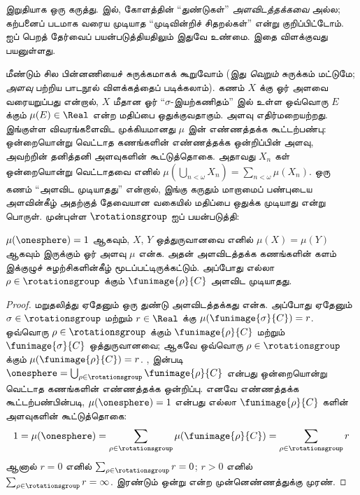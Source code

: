 \documentclass[../../../include/open-logic-section]{subfiles}
\begin{document}
இறுதியாக ஒரு கருத்து.  இல்,
கோளத்தின் ``துண்டுகள்'' \emph{அளவிடத்தக்கவை}
அல்ல; கற்பனைப் படமாக வரைய முடியாத ``முடிவின்றிச்
சிதறல்கள்'' என்று குறிப்பிட்டோம்.
 ஐப் பெறத் தேர்வைப்
பயன்படுத்தியதிலும் இதுவே உண்மை. இதை விளக்குவது
பயனுள்ளது.

மீண்டும் சில பின்னணியைச் சுருக்கமாகக் கூறுவோம்
(இது \emph{வெறும்} சுருக்கம் மட்டுமே; \emph{அளவு}
பற்றிய பாடநூல் விளக்கத்தைப் படிக்கலாம்).
கணம் $X$ க்கு ஓர் அளவை வரையறுப்பது என்றால்,
$X$ மீதான ஓர் ``$\sigma$-இயற்கணிதம்'' இல் உள்ள
ஒவ்வொரு $E$ க்கும் $\mu(E) \in \Real$ என்ற மதிப்பை
ஒதுக்குவதாகும். அளவு எதிர்மறையற்றது. இங்குள்ள
விவரங்களைவிட முக்கியமானது $\mu$ இன்
எண்ணத்தக்க கூட்டற்பண்பு: ஒன்றையொன்று வெட்டாத கணங்களின்
எண்ணத்தக்க ஒன்றிப்பின் அளவு, அவற்றின் தனித்தனி
அளவுகளின் கூட்டுத்தொகை. அதாவது $X_n$ கள்
ஒன்றையொன்று வெட்டாதவை எனில்
$\mu(\bigcup_{n < \omega} X_n) = \sum_{n < \omega}\mu(X_n)$.
ஒரு கணம் ``அளவிட முடியாதது'' என்றால், இங்கு கருதும்
மாறாமைப் பண்புடைய அளவின்கீழ் அதற்குத் தேவையான
வகையில் மதிப்பை ஒதுக்க முடியாது என்று
பொருள். முன்புள்ள $\rotationsgroup$ ஐப் பயன்படுத்தி:

\begin{cor}[விட்டாலி]
$\mu(\onesphere) = 1$ ஆகவும், $X$, $Y$ ஒத்துருவானவை
எனில் $\mu(X) = \mu(Y)$ ஆகவும் இருக்கும் ஓர் அளவு
$\mu$ என்க. அதன் அளவிடத்தக்க கணங்களின் களம்
இக்குழுச் சுழற்சிகளின்கீழ் மூடப்பட்டிருக்கட்டும்.
அப்போது எல்லா $\rho \in
\rotationsgroup$ க்கும் $\funimage{\rho}{C}$ அளவிட
முடியாதது.
\end{cor}

\begin{proof}
மறுதலித்து ஏதேனும் ஒரு துண்டு அளவிடத்தக்கது என்க.
அப்போது ஏதேனும் $\sigma \in \rotationsgroup$
மற்றும் $r \in \Real$ க்கு
$\mu(\funimage{\sigma}{C}) = r$.
ஒவ்வொரு $\rho \in \rotationsgroup$ க்கும்
$\funimage{\rho}{C}$ மற்றும்
$\funimage{\sigma}{C}$ ஒத்துருவானவை;
ஆகவே ஒவ்வொரு $\rho \in \rotationsgroup$ க்கும்
$\mu(\funimage{\rho}{C}) = r$.
,  இன்படி
$\onesphere = \bigcup_{\rho \in \rotationsgroup}\funimage{\rho}{C}$
என்பது ஒன்றையொன்று வெட்டாத கணங்களின் எண்ணத்தக்க
ஒன்றிப்பு. எனவே எண்ணத்தக்க கூட்டற்பண்பின்படி,
$\mu(\onesphere) = 1$ என்பது எல்லா
$\funimage{\rho}{C}$ களின் அளவுகளின் கூட்டுத்தொகை:
\[
	1 = \mu(\onesphere) = \sum_{\rho \in \rotationsgroup}\mu(\funimage{\rho}{C}) = \sum_{\rho \in \rotationsgroup}r
\]
ஆனால் $r = 0$ எனில் $\sum_{\rho \in \rotationsgroup}r = 0$;
$r > 0$ எனில் $\sum_{\rho \in \rotationsgroup}r = \infty$.
இரண்டும் ஒன்று என்ற முன்னெண்ணத்துக்கு முரண்.
\end{proof}
\end{document}
